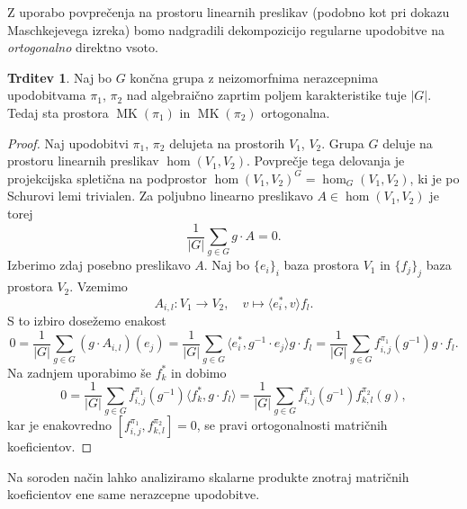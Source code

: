 \documentclass[11pt]{book}
\DeclareMathOperator\MK{MK}
\theoremstyle{definition}
\theoremstyle{zgled}
\theoremstyle{zgledbrezstevilke}
\theoremstyle{odprtproblem}
\theoremstyle{domacanaloga}
\newenvironment{dokaz}
    {\color{siva}\begin{proof}}
    {\end{proof}}
\theoremstyle{izrek}
\newtheorem{trditev}[theorem]{Trditev}
\begin{document}
Z uporabo povprečenja na prostoru linearnih preslikav (podobno kot pri dokazu Maschkejevega izreka) bomo nadgradili dekompozicijo regularne upodobitve na \emph{ortogonalno} direktno vsoto.

\begin{trditev}
Naj bo $G$ končna grupa z neizomorfnima nerazcepnima upodobitvama $\pi_1$, $\pi_2$ nad algebraično zaprtim poljem karakteristike tuje $|G|$. Tedaj sta prostora $\MK(\pi_1)$ in $\MK(\pi_2)$ ortogonalna.
\end{trditev}
\begin{dokaz}
Naj upodobitvi $\pi_1$, $\pi_2$ delujeta na prostorih $V_1$, $V_2$. Grupa $G$ deluje na prostoru linearnih preslikav $\hom(V_1, V_2)$. Povprečje tega delovanja je projekcijska spletična na podprostor $\hom(V_1, V_2)^G = \hom_G(V_1, V_2)$, ki je po Schurovi lemi trivialen. Za poljubno linearno preslikavo $A \in \hom(V_1, V_2)$ je torej
\[
    \frac{1}{|G|} \sum_{g \in G} g \cdot A = 0.
\]
Izberimo zdaj posebno preslikavo $A$. Naj bo $\{ e_i \}_i$ baza prostora $V_1$ in $\{ f_j \}_j$ baza prostora $V_2$. Vzemimo
\[
    A_{i,l} \colon V_1 \to V_2, \quad
    v \mapsto \langle e_i^*, v \rangle f_l.
\]
S to izbiro dosežemo enakost
\[
    0 = \frac{1}{|G|} \sum_{g \in G} (g \cdot A_{i,l})(e_j) =
    \frac{1}{|G|} \sum_{g \in G} \langle e_i^*, g^{-1} \cdot e_j \rangle g \cdot f_l =
    \frac{1}{|G|} \sum_{g \in G} f_{i,j}^{\pi_1}(g^{-1}) g \cdot f_l.
\]
Na zadnjem uporabimo še $f_k^*$ in dobimo
\[
    0 = \frac{1}{|G|} \sum_{g \in G} f_{i,j}^{\pi_1}(g^{-1}) \langle f_k^*, g \cdot f_l \rangle =
    \frac{1}{|G|} \sum_{g \in G} f_{i,j}^{\pi_1}(g^{-1}) f_{k,l}^{\pi_2}(g),
\]
kar je enakovredno $[ f_{i,j}^{\pi_1}, f_{k,l}^{\pi_2} ] = 0$, se pravi ortogonalnosti matričnih koeficientov.
\end{dokaz}

Na soroden način lahko analiziramo skalarne produkte znotraj matričnih koeficientov ene same nerazcepne upodobitve.
\end{document}
